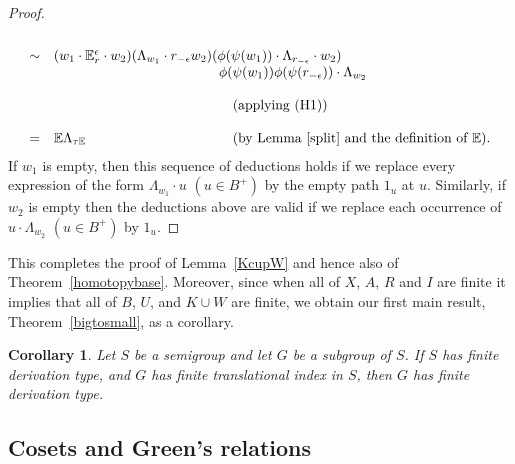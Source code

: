 \documentclass[11pt]{amsart}
\newtheorem{cor}{Corollary}
\theoremstyle{plain}
\begin{document}
\begin{proof}
\[\begin{array}{llll}
 & & &  \\
 & \sim & (w_1 \cdot {\mathbb{E}}_r^{\epsilon} \cdot w_2)
(\Lambda_{w_1} \cdot r_{-\epsilon} w_2)
(\phi (\psi (w_1)) \cdot \Lambda_{r_{- \epsilon}} \cdot w_2)
 & \\
 & &  \quad \quad \quad \quad  \quad \quad  \quad \quad \quad \quad \quad \quad \phi(\psi(w_1)) \phi(\psi(r_{-\epsilon})) \cdot \Lambda_{w_2} & \\
 & & &  \\
 & & \quad \quad \quad \quad   \quad \quad \quad  \quad \quad \quad \quad \quad \quad \mbox{(applying (H1))} & \\
 & & &  \\
 & = & {\mathbb{E}} \Lambda_{\tau {\mathbb{E}}} \quad \quad \quad \quad \quad \ \  \quad \quad \quad \quad \quad \mbox{(by Lemma~\ref{split} and the definition of ${\mathbb{E}}$)}.
\end{array}
\]
If $w_1$ is empty, then this sequence of deductions holds if we replace every expression of the form $\Lambda_{w_1} \cdot u$ $(u \in B^+)$ by the empty path $1_u$ at $u$. Similarly, if $w_2$ is empty then the deductions above are valid if we replace each occurrence of $u \cdot \Lambda_{w_2}$ $(u \in B^+)$ by $1_u$.  
\end{proof}

This completes the proof of Lemma~\ref{KcupW} and hence also of
Theorem~\ref{homotopybase}. Moreover, since when all of $X$, $A$, $R$ and $I$ are finite it implies that all of $B$, $U$, and $K \cup W$ are finite, we obtain our first main result, Theorem~\ref{bigtosmall}, as a corollary.

\begin{cor}\label{mainresultcorol}
Let $S$ be a semigroup and let $G$ be a subgroup of $S$. If $S$ has finite derivation type,
and $G$ has finite translational index in $S$, then $G$ has finite derivation type.
\end{cor}

\subsection{Cosets and Green's relations}
\end{document}
